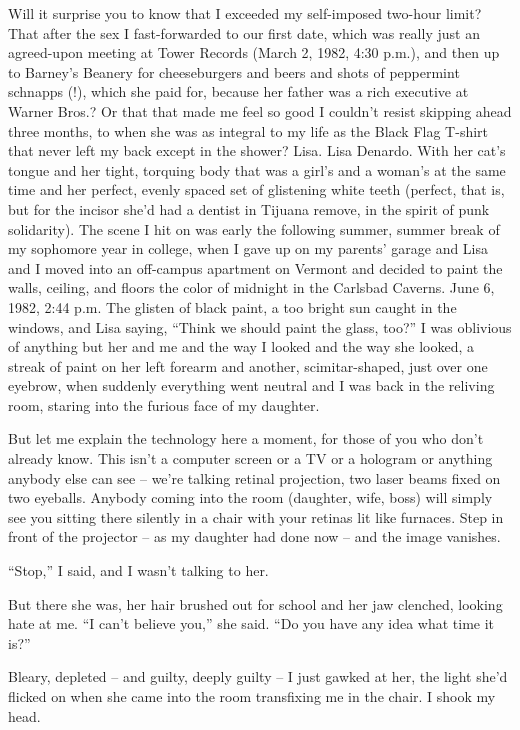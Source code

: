 \documentclass[11pt,a4paper]{article}
\newcommand{\qm}[1]{“#1”}
\begin{document}
Will it surprise you to know that I exceeded my self-imposed two-hour limit? That after the sex I fast-forwarded to our first date, which was really just an agreed-upon meeting at Tower Records (March 2, 1982, 4:30 p.m.), and then up to Barney's Beanery for cheeseburgers and beers and shots of peppermint schnapps (!), which she paid for, because her father was a rich executive at Warner Bros.? Or that that made me feel so good I couldn't resist skipping ahead three months, to when she was as integral to my life as the Black Flag T-shirt that never left my back except in the shower? Lisa. Lisa Denardo. With her cat's tongue and her tight, torquing body that was a girl's and a woman's at the same time and her perfect, evenly spaced set of glistening white teeth (perfect, that is, but for the incisor she'd had a dentist in Tijuana remove, in the spirit of punk solidarity). The scene I hit on was early the following summer, summer break of my sophomore year in college, when I gave up on my parents' garage and Lisa and I moved into an off-campus apartment on Vermont and decided to paint the walls, ceiling, and floors the color of midnight in the Carlsbad Caverns. June 6, 1982, 2:44 p.m. The glisten of black paint, a too bright sun caught in the windows, and Lisa saying, \qm{Think we should paint the glass, too?} I was oblivious of anything but her and me and the way I looked and the way she looked, a streak of paint on her left forearm and another, scimitar-shaped, just over one eyebrow, when suddenly everything went neutral and I was back in the reliving room, staring into the furious face of my daughter.

But let me explain the technology here a moment, for those of you who don't already know. This isn't a computer screen or a TV or a hologram or anything anybody else can see – we're talking retinal projection, two laser beams fixed on two eyeballs. Anybody coming into the room (daughter, wife, boss) will simply see you sitting there silently in a chair with your retinas lit like furnaces. Step in front of the projector – as my daughter had done now – and the image vanishes.

\qm{Stop,} I said, and I wasn't talking to her.

But there she was, her hair brushed out for school and her jaw clenched, looking hate at me. \qm{I can't believe you,} she said. \qm{Do you have any idea what time it is?}

Bleary, depleted – and guilty, deeply guilty – I just gawked at her, the light she'd flicked on when she came into the room transfixing me in the chair. I shook my head.
\end{document}
